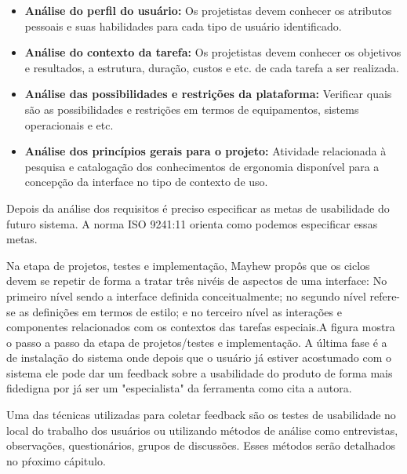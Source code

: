 \begin{itemize}
\item \textbf{Análise do perfil do usuário:} Os projetistas devem conhecer os atributos pessoais e suas habilidades para cada tipo de usuário identificado. 
	
\item \textbf{Análise do contexto da tarefa:} Os projetistas devem conhecer os objetivos e resultados, a estrutura, duração, custos e etc. de cada tarefa a ser realizada.

\item \textbf{Análise das possibilidades e restrições da plataforma:} Verificar quais são as possibilidades e restrições em termos de equipamentos, sistems operacionais e etc.

\item \textbf{Análise dos princípios gerais para o projeto:} Atividade relacionada à pesquisa e catalogação dos conhecimentos de ergonomia disponível para a concepção da interface no tipo de contexto de uso.

\end{itemize}


	Depois da análise dos requisitos é preciso especificar as metas de usabilidade do futuro sistema. A norma ISO 9241:11 orienta como podemos especificar essas metas.


	Na etapa de projetos, testes e implementação, Mayhew propôs que os ciclos devem se repetir de forma a tratar três nivéis de aspectos de uma interface: No primeiro nível sendo a interface definida conceitualmente; no segundo nível refere-se as definições em termos de estilo; e no terceiro nível as interações e componentes relacionados com os contextos das tarefas especiais.A figura mostra o passo a passo da etapa de projetos/testes e implementação.
	A última fase é a de instalação do sistema onde depois que o usuário já estiver acostumado com o sistema ele pode dar um feedback sobre a usabilidade do produto de forma mais fidedigna por já ser um "especialista" da ferramenta como cita a autora. 


	Uma das técnicas utilizadas para coletar feedback são os testes de usabilidade no local do trabalho dos usuários ou utilizando métodos de análise como entrevistas, observações, questionários, grupos de discussões. Esses métodos serão detalhados no pŕoximo cápitulo.


